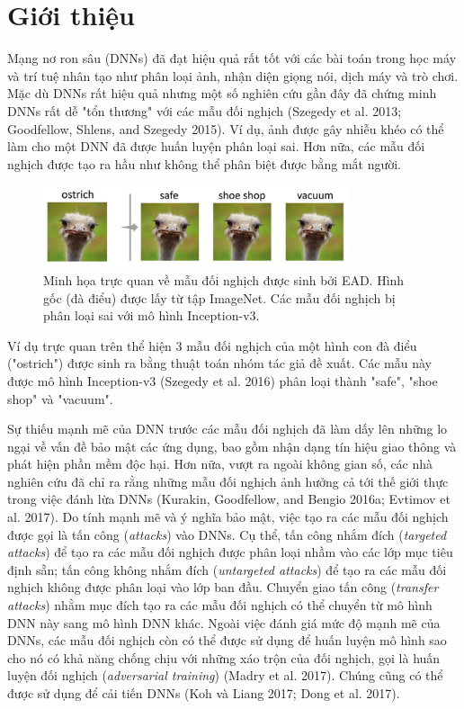 \chapter{Giới thiệu}
Mạng nơ ron sâu (DNNs) đã đạt hiệu quả rất tốt với các bài toán trong học máy
và trí tuệ nhân tạo như phân loại ảnh, nhận diện giọng nói, dịch máy và trò chơi.
Mặc dù DNNs rất hiệu quả nhưng một số nghiên cứu gần đây đã chứng minh DNNs rất 
dễ  "tổn thương" với các mẫu đối nghịch (Szegedy et al. 2013; Goodfellow, Shlens, 
and Szegedy 2015). Ví dụ, ảnh được gây nhiễu khéo có thể
làm cho một DNN đã được huấn luyện phân loại sai. Hơn nữa, các mẫu đối nghịch
được tạo ra hầu như không thể phân biệt được bằng mắt người. 
\begin{figure}[H] %
    \centering %
    \includegraphics[width=0.8\textwidth]{assets/fig_01.png} 
    \caption{Minh họa trực quan về mẫu đối nghịch được sinh bởi EAD. 
    Hình gốc (đà điểu) được lấy từ tập ImageNet. Các mẫu đối nghịch bị 
    phân loại sai với mô hình Inception-v3.} %
    \label{fig:fg_01}
\end{figure}
Ví dụ trực quan trên thể hiện 3 mẫu đối nghịch của một hình con đà điểu ("ostrich") 
được sinh ra bằng thuật toán nhóm tác giả đề xuất. Các mẫu này được mô hình Inception-v3 
(Szegedy et al. 2016) phân loại thành "safe", "shoe shop" và "vacuum". 

Sự thiếu mạnh mẽ của DNN trước các mẫu đối nghịch đã làm dấy lên những lo ngại 
về vấn đề bảo mật các ứng dụng, bao gồm nhận dạng tín hiệu giao thông 
và phát hiện phần mềm độc hại. Hơn nữa, vượt ra ngoài không gian số, 
các nhà nghiên cứu đã chỉ ra rằng những mẫu đối nghịch ảnh hưởng cả tới thế giới thực trong việc đánh lừa DNNs (Kurakin, Goodfellow, and Bengio 2016a; Evtimov et al. 2017).
Do tính mạnh mẽ và ý nghĩa bảo mật, việc tạo ra các mẫu đối nghịch được gọi là 
tấn công (\textit{attacks}) vào DNNs. Cụ thể, tấn công nhắm đích 
(\textit{targeted attacks}) để tạo ra các mẫu đối nghịch được phân loại nhầm vào các lớp mục tiêu 
định sẵn; tấn công không nhắm đích (\textit{untargeted attacks}) để tạo ra các mẫu đối nghịch không được phân loại vào lớp ban đầu. Chuyển giao tấn công (\textit{transfer attacks}) nhằm mục đích tạo ra các mẫu đối nghịch có thể chuyển 
từ mô hình DNN này sang mô hình DNN khác. Ngoài việc đánh giá mức độ mạnh mẽ của DNNs,
các mẫu đối nghịch còn có thể được sử dụng để huấn luyện mô hình sao cho nó có khả năng chống chịu 
với những xáo trộn của đối nghịch, gọi là huấn luyện đối nghịch (\textit{adversarial training}) 
(Madry et al. 2017). Chúng cũng có thể được sử dụng để cải tiến DNNs (Koh và Liang 2017;
Dong et al. 2017). 

